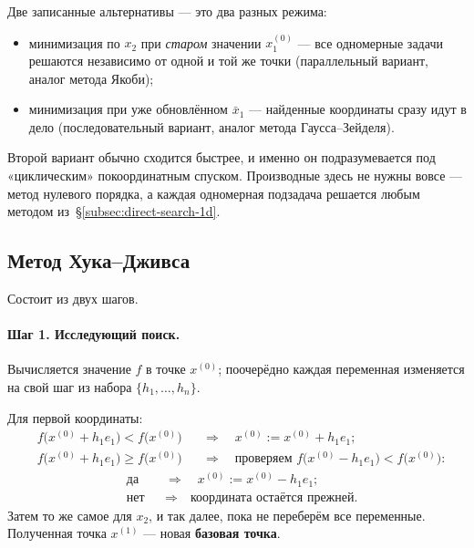 \begin{idea}
Две записанные альтернативы — это два разных режима:
\begin{itemize}[nosep,left=0pt]
  \item минимизация по $x_2$ при \emph{старом} значении $x_1^{(0)}$ — все
        одномерные задачи решаются независимо от одной и той же точки
        (параллельный вариант, аналог метода Якоби);
  \item минимизация при уже обновлённом $\bar{x}_1$ — найденные координаты сразу
        идут в дело (последовательный вариант, аналог метода Гаусса–Зейделя).
\end{itemize}
Второй вариант обычно сходится быстрее, и именно он подразумевается под
«циклическим» покоординатным спуском. Производные здесь не нужны вовсе — метод
нулевого порядка, а каждая одномерная подзадача решается любым методом
из~\S\ref{subsec:direct-search-1d}.
\end{idea}

\subsection{Метод Хука--Дживса}

Состоит из двух шагов.

\paragraph{Шаг 1. Исследующий поиск.}
Вычисляется значение $f$ в точке $x^{(0)}$; поочерёдно каждая переменная
изменяется на свой шаг из набора $\{h_1, \dots, h_n\}$.

Для первой координаты:
\[
  \begin{aligned}
    &f\big(x^{(0)} + h_1 e_1\big) < f\big(x^{(0)}\big)
     &&\Longrightarrow\quad x^{(0)} := x^{(0)} + h_1 e_1 ; \\[4pt]
    &f\big(x^{(0)} + h_1 e_1\big) \ge f\big(x^{(0)}\big)
     &&\Longrightarrow\quad
       \text{проверяем } f\big(x^{(0)} - h_1 e_1\big) < f\big(x^{(0)}\big) :
  \end{aligned}
\]
\[
  \begin{aligned}
    &\text{да} &&\Longrightarrow\quad x^{(0)} := x^{(0)} - h_1 e_1 ; \\
    &\text{нет} &&\Longrightarrow\quad \text{координата остаётся прежней.}
  \end{aligned}
\]
Затем то же самое для $x_2$, и так далее, пока не переберём все переменные.
Полученная точка $x^{(1)}$ — новая \textbf{базовая точка}.

